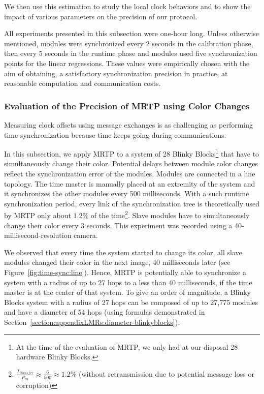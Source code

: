 We then use this estimation to study the local clock behaviors and to show the impact of various parameters on the precision of our protocol.

All experiments presented in this subsection were one-hour long. Unless otherwise mentioned, modules were synchronized every 2 seconds in the calibration phase, then every 5 seconds in the runtime phase and modules used five synchronization points for the linear regressions. These values were empirically chosen with the aim of obtaining, a satisfactory synchronization precision in practice, at reasonable computation and communication costs.

\subsubsection{Evaluation of the Precision of MRTP using Color Changes}
\label{section:time-sync:color-changes}

Measuring clock offsets using message exchanges is as challenging as performing time synchronization because time keeps going during communications.

In this subsection, we apply MRTP to a system of 28 Blinky Blocks\footnote{At the time of the evaluation of MRTP, we only had at our disposal 28 hardware Blinky Blocks.} that have to simultaneously change their color. Potential delays between module color changes reflect the synchronization error of the modules. Modules are connected in a line topology. The time master is manually placed at an extremity of the system and it synchronizes the other modules every 500 milliseconds. With a such runtime synchronization period, every link of the synchronization tree is theoretically used by MRTP only about $1.2\%$ of the time\footnote{$\frac{T_{transfer}}{P_{ru}} \approx \frac{6}{500} \approx 1.2\%$ (without retransmission due to potential message loss or corruption)}. Slave modules have to simultaneously change their color every 3 seconds. This experiment was recorded using a 40-millisecond-resolution camera.

We observed that every time the system started to change its color, all slave modules changed their color in the next image, 40 milliseconds later (see Figure~\ref{fig:time-sync:line}). Hence, MRTP is potentially able to synchronize a system with a radius of up to 27 hops to a less than 40 milliseconds, if the time master is at the center of that system. To give an order of magnitude, a Blinky Blocks system with a radius of 27 hops can be composed of up to 27,775 modules and have a diameter of 54 hops (using formulas demonstrated in Section~\ref{section:appendixLMRs:diameter-blinkyblocks}).

